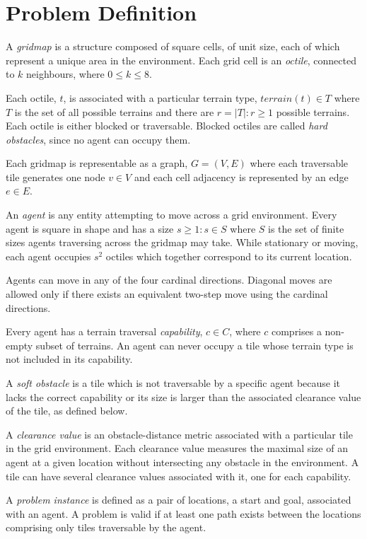 \section{Problem Definition}
A \emph{gridmap} is a structure composed of square cells, of unit size, each of which represent a unique area in the environment. 
Each grid cell is an \emph{octile}, connected to $k$ neighbours, where  $0 \leq k \leq 8$. 
\par \indent
Each octile, $t$, is associated with a particular terrain type, $terrain(t) \in T$ where $T$ is the set of all possible terrains and there are $r = |T| : r \geq 1$ possible terrains.
Each octile is either blocked or traversable. 
Blocked octiles are called \emph{hard obstacles}, since no agent can occupy them.
\par \indent
Each gridmap is representable as a graph, $G = (V, E)$ where each traversable tile generates one node $v \in V$ and each cell adjacency is represented by an edge $e \in E$.
\par \indent
An \emph{agent} is any entity attempting to move across a grid environment. 
Every agent is square in shape and has a size $s \geq 1 : s \in S$ where $S$ is the set of finite sizes agents traversing across the gridmap may take.
While stationary or moving, each agent occupies $s^2$ octiles which together correspond to its current location. 
\par \indent
Agents can move in any of the four cardinal directions. 
Diagonal moves are allowed only if there exists an equivalent two-step move using the cardinal directions.
\par \indent
Every agent has a terrain traversal \emph{capability}, $c \in C$, where $c$ comprises a non-empty subset of terrains.
An agent can never occupy a tile whose terrain type is not included in its capability.
\par \indent 
A \emph{soft obstacle} is a tile which is not traversable by a specific agent because it lacks the correct capability or its size is larger than the associated clearance value of the tile, as defined below. 
\par \indent
A \emph{clearance value} is an obstacle-distance metric associated with a particular tile in the grid environment. 
Each clearance value measures the maximal size of an agent at a given location without intersecting any obstacle in the environment. 
A tile can have several clearance values associated with it, one for each capability. 
\par \indent
A \emph{problem instance} is defined as a pair of locations, a start and goal, associated with an agent. A problem is valid if at least one path exists between the locations comprising only tiles traversable by the agent. 
